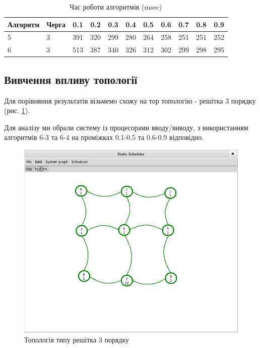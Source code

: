 \begin{table}[H]
\caption{Час роботи алгоритмів (msec)}
\label{tab:big_table}
\centering
\begin{tabular}{llrrrrrrrrr}
\toprule
Алгоритм & Черга &   0.1 &   0.2 &   0.3 &   0.4 &   0.5 &   0.6 &   0.7 &   0.8 &   0.9 \\
\midrule
5 & 3 & 391 & 320 & 299 & 280 & 264 & 258 & 251 & 251 & 252 \\
6 & 3 & 513 & 387 & 340 & 326 & 312 & 302 & 299 & 298 & 295 \\
\bottomrule
\end{tabular}
\end{table}

\subsection{Вивчення впливу топології}

Для порівняння результатів візьмемо схожу на тор топологію - решітка 3 порядку (рис. \ref{fig:grid}).

Для аналізу ми обрали систему із процесорами вводу/виводу, з використанням алгоритмів 6-3 та 6-4 на проміжках 0.1-0.5 та 0.6-0.9 відповідно.

    \begin{figure}[h!]
      \begin{center}
        \includegraphics[width=\textwidth]{res/grid.png}
      \end{center}
      \caption{Топологія типу решітка 3 порядку}
    \label{fig:grid}
    \end{figure}

